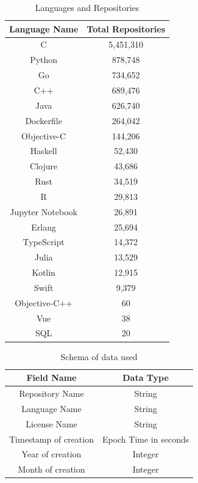 \documentclass[12pt,conference]{IEEEtran}
\begin{document}
\begin{table}[h!]
  \centering
  \begin{tabular}{||c | c||} 
  \hline
  Language Name & Total Repositories  \\ [0.5ex] 
  \hline \hline
  C & 5,451,310 \\  \hline 
 Python & 878,748 \\  \hline 
 Go & 734,652 \\  \hline 
 C++ & 689,476 \\  \hline 
 Java & 626,740 \\  \hline 
 Dockerfile & 264,042 \\  \hline 
 Objective-C & 144,206 \\  \hline 
 Haskell & 52,430 \\  \hline 
 Clojure & 43,686 \\  \hline 
 Rust & 34,519 \\  \hline 
 R & 29,813 \\  \hline 
 Jupyter Notebook & 26,891 \\  \hline 
 Erlang & 25,694 \\  \hline 
 TypeScript & 14,372 \\  \hline 
 Julia & 13,529 \\  \hline 
 Kotlin & 12,915 \\  \hline 
 Swift & 9,379 \\  \hline 
 Objective-C++ & 60 \\  \hline 
 Vue & 38 \\  \hline 
 SQL & 20 \\ [1ex] 
  \hline
  \end{tabular}
\caption{Languages and Repositories}
\label{table:1}
\end{table}

\begin{table}[h!]
  \centering
  \begin{tabular}{||c | c||} 
  \hline
  Field Name & Data Type  \\ [0.5ex] 
  \hline \hline
 Repository Name & String \\ \hline
 Language Name & String \\ \hline
 License Name & String \\ \hline
 Timestamp of creation & Epoch Time in seconds\\ \hline
 Year of creation & Integer \\ \hline
 Month of creation & Integer \\ [0.5ex] 
  \hline
  \end{tabular}
\caption{Schema of data used}
\label{table:2}
\end{table}
\end{document}
